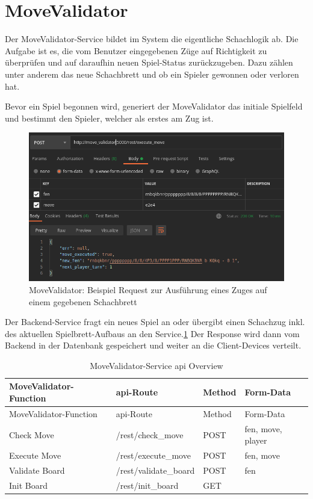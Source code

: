 \hypertarget{movevalidator}{%
\section{MoveValidator}\label{movevalidator}}

Der MoveValidator-Service bildet im System die eigentliche Schachlogik
ab. Die Aufgabe ist es, die vom Benutzer eingegebenen Züge auf
Richtigkeit zu überprüfen und auf daraufhin neuen Spiel-Status
zurückzugeben. Dazu zählen unter anderem das neue Schachbrett und ob ein
Spieler gewonnen oder verloren hat.

Bevor ein Spiel begonnen wird, generiert der MoveValidator das initiale
Spielfeld und bestimmt den Spieler, welcher als erstes am Zug ist.

\begin{figure}
\centering
\includegraphics{images/ATC_movevalidator_execute_move.png}
\caption{MoveValidator: Beispiel Request zur Ausführung eines Zuges auf
einem gegebenen Schachbrett \label{ATC_movevalidator_execute_move}}
\end{figure}

Der Backend-Service fragt ein neues Spiel an oder übergibt einen
Schachzug inkl. des aktuellen Spielbrett-Aufbaus an den
Service.\ref{ATC_movevalidator_execute_move} Der Response wird dann vom
Backend in der Datenbank gespeichert und weiter an die Client-Devices
verteilt.

\begin{longtable}[]{@{}llll@{}}
\caption{MoveValidator-Service \gls{api} Overview}\tabularnewline
\toprule
MoveValidator-Function & \gls{api}-Route & Method &
Form-Data\tabularnewline
\midrule
\endfirsthead
\toprule
MoveValidator-Function & \gls{api}-Route & Method &
Form-Data\tabularnewline
\midrule
\endhead
Check Move & /rest/check\_move & POST & fen, move, player\tabularnewline
Execute Move & /rest/execute\_move & POST & fen, move\tabularnewline
Validate Board & /rest/validate\_board & POST & fen\tabularnewline
Init Board & /rest/init\_board & GET &\tabularnewline
\bottomrule
\end{longtable}

